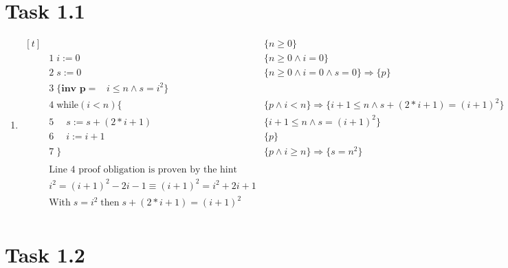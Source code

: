 \documentclass{article}
\author{\hmwkAuthorName}
\date{}
\newcommand{\answer}{\item[]} %
\begin{document}
	
	
	\section{Task 1.1}
	
		\begin{enumerate}[label={(\alph*)}]
			
			\answer
			$\begin{aligned}[t]
				&\qquad \qquad \qquad \qquad \qquad \qquad \qquad \qquad &\{n \geq 0\} \\
				&1\; i := 0 &\{n \geq 0 \land i = 0\} \\
				&2\; s := 0 &\{n \geq 0 \land i = 0 \land s = 0\} \Rightarrow \{p\} \\
				&3\; \{\textbf{inv p} = \; \; \; i \leq n \land s = i^2\} \\
				&4\; \text{while}(i < n)\{ &\{p \land i < n\} \Rightarrow \{i + 1 \leq n \land s + (2 * i + 1) = (i + 1)^2\} \\
				&5\; \quad s := s + (2 * i + 1) &\{i + 1 \leq n \land s = (i + 1)^2\} \\
				&6\; \quad i := i + 1 &\{p\} \\
				&7\; \} &\{p \land i \geq n\} \Rightarrow \{s = n^2\} \\
				&\\
				&\text{Line 4 proof obligation is proven by the hint} \\
				&i^2 = (i + 1)^2 - 2i - 1 \equiv (i + 1)^2 = i^2 + 2i + 1 \\
				&\text{With} \; s = i^2 \; \text{then} \; s + (2 * i + 1) = (i + 1)^2 \\
			\end{aligned}$
			
		\end{enumerate}
	
	\section{Task 1.2}
	
\end{document}
